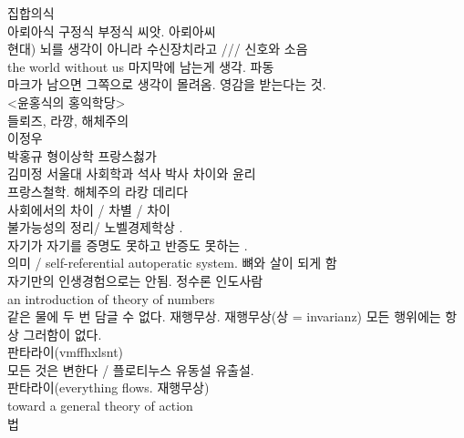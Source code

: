 \documentclass[11pt, a4paper]{article}
\begin{document}
집합의식\\
아뢰아식 구정식 부정식 씨앗. 아뢰아씨\\
현대) 뇌를 생각이 아니라 수신장치라고 /// 신호와 소음\\
the world without us 마지막에 남는게 생각. 파동 \\
마크가 남으면 그쪽으로 생각이 몰려옴. 영감을 받는다는 것.\\ <윤홍식의 홍익학당>\\
들뢰즈, 라깡, 해체주의 \\
이정우\\
박홍규 형이상학 프랑스첧가\\
김미정 서울대 사회학과 석사 박사 차이와 윤리\\
프랑스철학. 해체주의 라캉 데리다\\
사회에서의 차이 / 차별 / 차이 \\
불가능성의 정리/ 노벨경제학상 . \\
자기가 자기를 증명도 못하고 반증도 못하는 .\\
의미 / self-referential autoperatic system. 뼈와 살이 되게 함 \\
자기만의 인생경험으로는 안됨. 정수론 인도사람\\
an introduction of theory of numbers\\
같은 물에 두 번 담글 수 없다. 재행무상. 재행무상(상 = invarianz) 모든 행위에는 항상 그러함이 없다.\\ 판타라이(vmffhxlsnt)\\
모든 것은 변한다 / 플로티누스 유동설 유출설.\\ 판타라이(everything flows. 재행무상)\\
toward a general theory of action\\
법\\
\end{document}
